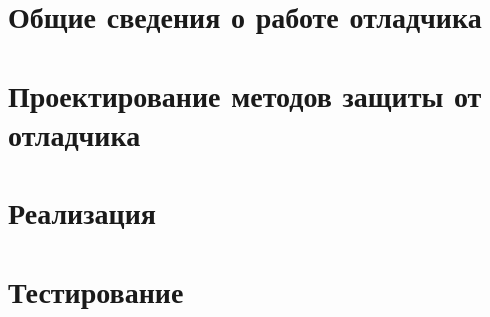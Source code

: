


  \newpage

  \tableofcontents
  \newpage

  \chapter{Общие сведения о работе отладчика}
  
  
  
  
  
  \chapter{Проектирование методов защиты от отладчика}
  
  
  
  
  
  \chapter{Реализация}
  
  
  \chapter{Тестирование}
  

